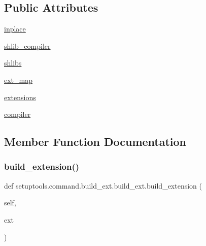 \subsection*{Public Attributes}
\begin{DoxyCompactItemize}
\item 
\hyperlink{classsetuptools_1_1command_1_1build__ext_1_1build__ext_aee4011126bb01161fccc5c02936cf97e}{inplace}
\item 
\hyperlink{classsetuptools_1_1command_1_1build__ext_1_1build__ext_a1c1a12eddf646ce19ed053e946a20450}{shlib\+\_\+compiler}
\item 
\hyperlink{classsetuptools_1_1command_1_1build__ext_1_1build__ext_a98d935b613d02705241d265c4cb88848}{shlibs}
\item 
\hyperlink{classsetuptools_1_1command_1_1build__ext_1_1build__ext_accc4818dbd6845e597a127374a314726}{ext\+\_\+map}
\item 
\hyperlink{classsetuptools_1_1command_1_1build__ext_1_1build__ext_a30d4f3d4b6c7e7007e648e76c83b9adf}{extensions}
\item 
\hyperlink{classsetuptools_1_1command_1_1build__ext_1_1build__ext_a05532b93ff94ae0da5908b6973439c2a}{compiler}
\end{DoxyCompactItemize}


\subsection{Member Function Documentation}
\mbox{\label{classsetuptools_1_1command_1_1build__ext_1_1build__ext_a5d505e4bd3daa3a2ef2a5fead744d519}} 
\subsubsection{\texorpdfstring{build\+\_\+extension()}{build\_extension()}}
{\footnotesize\ttfamily def setuptools.\+command.\+build\+\_\+ext.\+build\+\_\+ext.\+build\+\_\+extension (\begin{DoxyParamCaption}\item[{}]{self,  }\item[{}]{ext }\end{DoxyParamCaption})}

